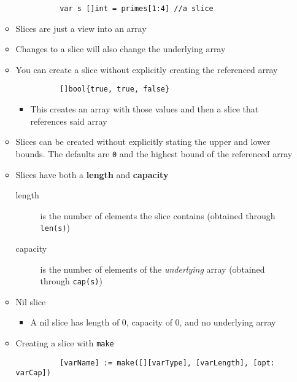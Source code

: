 \documentclass[11pt, oneside]{article}   	%
\begin{document}
\begin{itemize}
\begin{itemize}
\begin{verbatim}
          var s []int = primes[1:4] //a slice
        \end{verbatim}
        \item Slices are just a view into an array
        \item Changes to a slice will also change the underlying array
        \item You can create a slice without explicitly creating the referenced array
        \begin{verbatim}
          []bool{true, true, false}
        \end{verbatim}
          \begin{itemize}
            \item This creates an array with those values and then a slice that references said array
          \end{itemize}
        \item Slices can be created without explicitly stating the upper and lower bounds. The defaults are \texttt{0} and the highest bound of the referenced array
        \item Slices have both a \textbf{length} and \textbf{capacity}
          \begin{description}
            \item[length] is the number of elements the slice contains (obtained through \texttt{len(s)})
            \item[capacity] is the number of elements of the \emph{underlying} array (obtained through \texttt{cap(s)})
          \end{description}
        \item Nil slice
          \begin{itemize}
            \item A nil slice has length of 0, capacity of 0, and no underlying array
          \end{itemize}
        \item Creating a slice with \texttt{make}
          \begin{verbatim}
          [varName] := make([][varType], [varLength], [opt: varCap])
          \end{verbatim}
      \end{itemize}
  \end{itemize}
\end{document}
